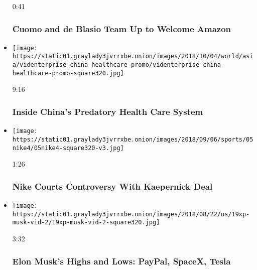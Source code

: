 \begin{itemize}
  0:41

  \hypertarget{cuomo-and-de-blasio-team-up-to-welcome-amazon}{%
  \subsubsection{Cuomo and de Blasio Team Up to Welcome
  Amazon}\label{cuomo-and-de-blasio-team-up-to-welcome-amazon}}
\item
  \href{https://www.nytimes3xbfgragh.onion/video/world/asia/100000005336868/capitalism-china-health-care-system.html?action=click\&module=video-series-bar\&region=header\&pgtype=Article\&playlistId=video/business}{}

  \texttt{[image: https://static01.graylady3jvrrxbe.onion/images/2018/10/04/world/asia/videnterprise\_china-healthcare-promo/videnterprise\_china-healthcare-promo-square320.jpg]}

  9:16

  \hypertarget{inside-chinas-predatory-health-care-system}{%
  \subsubsection{Inside China's Predatory Health Care
  System}\label{inside-chinas-predatory-health-care-system}}
\item
  \href{https://www.nytimes3xbfgragh.onion/video/sports/100000006086118/nike-courts-controversy-with-kaepernick-deal.html?action=click\&module=video-series-bar\&region=header\&pgtype=Article\&playlistId=video/business}{}

  \texttt{[image: https://static01.graylady3jvrrxbe.onion/images/2018/09/06/sports/05nike4/05nike4-square320-v3.jpg]}

  1:26

  \hypertarget{nike-courts-controversy-with-kaepernick-deal}{%
  \subsubsection{Nike Courts Controversy With Kaepernick
  Deal}\label{nike-courts-controversy-with-kaepernick-deal}}
\item
  \href{https://www.nytimes3xbfgragh.onion/video/business/100000006060092/elon-musk-tesla-spacex.html?action=click\&module=video-series-bar\&region=header\&pgtype=Article\&playlistId=video/business}{}

  \texttt{[image: https://static01.graylady3jvrrxbe.onion/images/2018/08/22/us/19xp-musk-vid-2/19xp-musk-vid-2-square320.jpg]}

  3:32

  \hypertarget{elon-musks-highs-and-lows-paypal-spacex-tesla}{%
  \subsubsection{Elon Musk's Highs and Lows: PayPal, SpaceX,
  Tesla}\label{elon-musks-highs-and-lows-paypal-spacex-tesla}}
\end{itemize}

